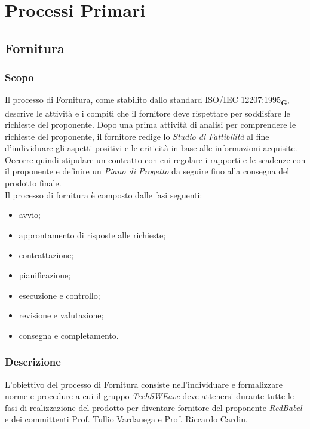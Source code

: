 \section{Processi Primari}
\subsection{Fornitura}
\subsubsection{Scopo}
Il processo di Fornitura, come stabilito dallo standard ISO/IEC 12207:1995\textsubscript{\textbf{G}}, descrive le attività e i compiti che il fornitore deve rispettare per soddisfare le richieste del proponente. Dopo una prima attività di analisi per comprendere le richieste del proponente, il fornitore redige lo \textit{Studio di Fattibilità} al fine d'individuare gli aspetti positivi e le criticità in base alle informazioni acquisite. Occorre quindi stipulare un contratto con cui regolare i rapporti e le scadenze con il proponente e definire un \textit{Piano di Progetto} da seguire fino alla consegna del prodotto finale.
\\Il processo di fornitura è composto dalle fasi seguenti:
\begin{itemize}
    \item avvio;
    \item approntamento di risposte alle richieste;
    \item contrattazione;
    \item pianificazione;
    \item esecuzione e controllo;
    \item revisione e valutazione;
    \item consegna e completamento.
\end{itemize}
\subsubsection{Descrizione}
L'obiettivo del processo di Fornitura consiste nell'individuare e formalizzare norme e procedure a cui il gruppo \textit{TechSWEave} deve attenersi durante tutte le fasi di realizzazione del prodotto per diventare fornitore del proponente \textit{RedBabel} e dei committenti Prof. Tullio Vardanega e Prof. Riccardo Cardin.

